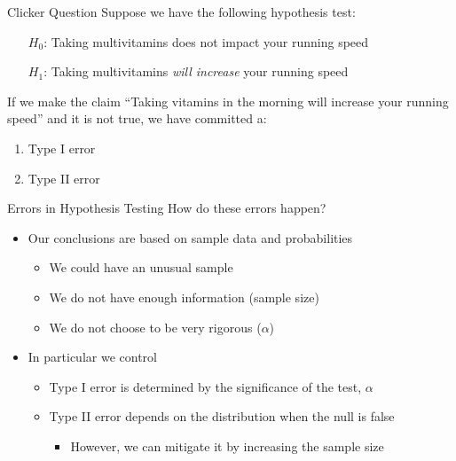 \documentclass{beamer}
\begin{document}
\begin{frame}{Clicker Question}
	Suppose we have the following hypothesis test:
	
	\begin{center}
		\begin{itemize}
			\item[$H_0$:] Taking multivitamins does not impact your running speed
			\item[$H_1$:] Taking multivitamins \textit{will increase} your running speed
		\end{itemize}
	\end{center}

	If we make the claim ``Taking vitamins in the morning will increase your running speed'' and it is not true, we have committed a:
	
	\begin{enumerate}[label=(\alph*)]
		\item Type I error
		\item Type II error
	\end{enumerate}
\end{frame}

\begin{frame}{Errors in Hypothesis Testing}
	How do these errors happen?
	\begin{itemize}
		\item Our conclusions are based on sample data and probabilities 
		      \begin{itemize}
		      	\item We could have an unusual sample
		      	\item We do not have enough information (sample size)
		      	\item We do not choose to be very rigorous ($\alpha$)
		      \end{itemize}
		      
		\item In particular we control
		      \begin{itemize}
		      	\item Type I error is determined by the significance of the test, $\alpha$
		      	\item Type II error depends on the distribution when the null is false
		      	      \begin{itemize}
		      	      	\item However, we can mitigate it by increasing the sample size
		      	      \end{itemize}
		      \end{itemize}
	\end{itemize}
\end{frame}
\end{document}
